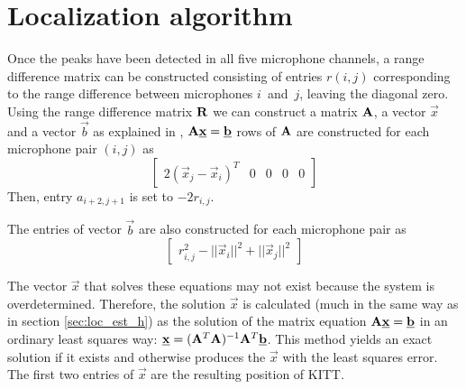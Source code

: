 \documentclass[11pt,titlepage]{report}
\begin{document}
\section{Localization algorithm}
\label{sec:loc_alg}
Once the peaks have been detected in all five microphone channels, a range difference matrix can be constructed consisting of entries $r(i,j)$ corresponding to the range difference between microphones $i$~and~$j$, leaving the diagonal zero. 
Using the range difference matrix $\mathbf{R}$ we can construct a matrix $\mathbf{A}$, a vector $\vec{x}$ and a vector $\vec{b}$ as explained in \cite{epo4-manual}, $\mathbf{A}\mathbf{\underline{x}}=\mathbf{\underline{b}}$ rows of $\mathbf{A}$ are constructed for each microphone pair $(i,j)$ as
\begin{equation}
\begin{bmatrix}
2(\vec{x}_j-\vec{x}_i)^T & 0 & 0 & 0 & 0
\end{bmatrix}
\end{equation}
Then, entry $a_{i+2,j+1}$ is set to $-2r_{i,j}$.


The entries of vector $\vec{b}$ are also constructed for each microphone pair as
\begin{equation}
\begin{bmatrix}
r_{i,j}^2-||\vec{x}_i||^2+||\vec{x}_j||^2
\end{bmatrix}
\end{equation}

The vector $\vec{x}$ that solves these equations may not exist because the system is overdetermined. Therefore, the solution $\vec{x}$ is calculated (much in the same way as in section \ref{sec:loc_est_h}) as the solution of the matrix equation $\mathbf{A}\mathbf{\underline{x}}=\mathbf{\underline{b}}$ in an ordinary least squares way: $\mathbf{\underline{x}}=(\mathbf{A}^T\mathbf{A})^{-1}\mathbf{A}^T\mathbf{\underline{b}}$. This method yields an exact solution if it exists and otherwise produces the $\vec{x}$ with the least squares error. The first two entries of $\vec{x}$ are the resulting position of KITT.
\end{document}
